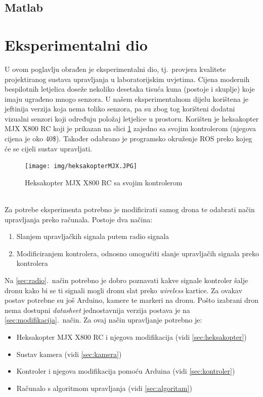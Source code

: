 \documentclass[times, utf8, diplomski]{fer}
\begin{document}
\subsection{Matlab}

\section{Eksperimentalni dio}
U ovom poglavlju obrađen je eksperimentalni dio, tj.~provjera kvalitete projektiranog sustava upravljanja u laboratorijskim uvjetima. 
Cijena modernih bespilotnih letjelica doseže nekoliko desetaka tisuća kuna (postoje i skuplje) koje imaju ugrađeno mnogo senzora. U našem eksperimentalnom dijelu korištena je jeftinija verzija koja nema toliko senzora, pa su zbog tog korišteni dodatni vizualni senzori koji određuju položaj letjelice u prostoru. Korišten je heksakopter MJX X800 RC koji je prikazan na slici \ref{fig:MJX X800 RC} zajedno sa svojim kontrolerom (njegova cijena je oko 40\$). Također odabrano je programsko okruženje ROS preko kojeg će se cijeli sustav upravljati. 
\begin{figure}[htb]
\centering
\texttt{[image: img/heksakopterMJX.JPG]}
\caption{Heksakopter MJX X800 RC sa svojim kontrolerom}
\label{fig:MJX X800 RC}
\end{figure}\\

Za potrebe eksperimenta potrebno je modificirati samog drona te odabrati način upravljanja preko računala. Postoje dva načina:
\begin{enumerate}
\item Slanjem upravljačkih signala putem radio signala\label{sec:radio}
\item Modificiranjem kontrolera, odnosno omogućiti slanje upravljačih signala preko kontrolera\label{sec:modifikacija}
\end{enumerate}
Na \ref{sec:radio}.~način potrebno je dobro poznavati kakve signale kontroler šalje dronu kako bi se ti signali mogli dronu slat preko \emph{wireless} kartice. Za ovakav postav potrebne su još Arduino, kamere te markeri na dronu. Pošto izabrani dron nema dostupni \emph{datasheet} jednostavnija verzija postava je  na \ref{sec:modifikacija}.~način. Za ovaj način upravljanje potrebno je:
\begin{itemize}
\item Heksakopter MJX X800 RC i njegova modifikacija (vidi \ref{sec:heksakopter})
\item Sustav kamera (vidi \ref{sec:kamera})
\item Kontroler i njegova modifikacija pomoću Arduina (vidi \ref{sec:kontroler})
\item Računalo s algoritmom upravljanja (vidi \ref{sec:algoritam})
\end{itemize}
\end{document}

